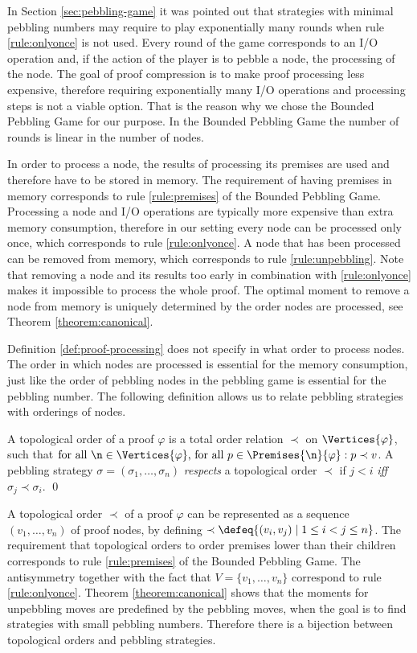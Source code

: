 In Section \ref{sec:pebbling-game} it was pointed out that strategies with minimal pebbling numbers may require to play exponentially many rounds when rule \ref{rule:onlyonce} is not used.
Every round of the game corresponds to an I/O operation and, if the action of the player is to pebble a node, the processing of the node.
The goal of proof compression is to make proof processing less expensive, therefore requiring exponentially many I/O operations and processing steps is not a viable option.
That is the reason why we chose the Bounded Pebbling Game for our purpose.
In the Bounded Pebbling Game the number of rounds is linear in the number of nodes.

In order to process a node, the results of processing its premises are used and therefore have to be stored in memory.
The requirement of having premises in memory corresponds to rule \ref{rule:premises} of the Bounded Pebbling Game. 
Processing a node and I/O operations are typically more expensive than extra memory consumption, therefore in our setting every node can be processed only once, which corresponds to rule \ref{rule:onlyonce}.
A node that has been processed can be removed from memory, which corresponds to rule \ref{rule:unpebbling}.
Note that removing a node and its results too early in combination with \ref{rule:onlyonce} makes it impossible to process the whole proof.
The optimal moment to remove a node from memory is uniquely determined by the order nodes are processed, see Theorem \ref{theorem:canonical}.

Definition \ref{def:proof-processing} does not specify in what order to process nodes.
The order in which nodes are processed is essential for the memory consumption, just like the order of pebbling nodes in the pebbling game is essential for the pebbling number.
The following definition allows us to relate pebbling strategies with orderings of nodes.

\begin{definition}
\label{def:topological-order}
A topological order of a proof $\varphi$ is a total order relation $\prec$ on $\Vertices{\varphi}$, such that 
$\text{for all } \n \in \Vertices{\varphi} \text{, for all } p \in \Premises{\n}{\varphi}:
p \prec v$.
A pebbling strategy $\sigma = (\sigma_1,\ldots,\sigma_n)$ \emph{respects} a topological order $\prec$ if $j < i$ \emph{iff} $\sigma_j \prec \sigma_i$.
\qed
\end{definition}

A topological order $\prec$ of a proof $\varphi$ can be represented as a sequence $(v_1,\dots,v_n)$ of proof nodes, by defining $\prec \defeq \{(v_i,v_j) \mid 1 \leq i < j \leq n\}$. 
The requirement that topological orders to order premises lower than their children corresponds to rule \ref{rule:premises} of the Bounded Pebbling Game.
The antisymmetry together with the fact that $V = \{v_1,\dots,v_n\}$ correspond to rule \ref{rule:onlyonce}.
Theorem \ref{theorem:canonical} shows that the moments for unpebbling moves are predefined by the pebbling moves, when the goal is to find strategies with small pebbling numbers.
Therefore there is a bijection between topological orders and pebbling strategies.

